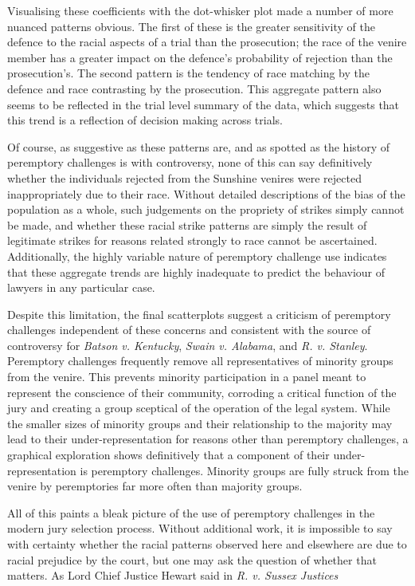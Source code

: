 \documentclass[12pt]{article}
\begin{document}
Visualising these coefficients with the dot-whisker plot made a number of more nuanced patterns obvious. The first of these is the greater sensitivity of the defence to the racial aspects of a trial than the prosecution; the race of the venire member has a greater impact on the defence's probability of rejection than the prosecution's. The second pattern is the tendency of race matching by the defence and race contrasting by the prosecution. This aggregate pattern also seems to be reflected in the trial level summary of the data, which suggests that this trend is a reflection of decision making across trials.

Of course, as suggestive as these patterns are, and as spotted as the history of peremptory challenges is with controversy, none of this can say definitively whether the individuals rejected from the Sunshine venires were rejected inappropriately due to their race. Without detailed descriptions of the bias of the population as a whole, such judgements on the propriety of strikes simply cannot be made, and whether these racial strike patterns are simply the result of legitimate strikes for reasons related strongly to race cannot be ascertained. Additionally, the highly variable nature of peremptory challenge use indicates that these aggregate trends are highly inadequate to predict the behaviour of lawyers in any particular case.

Despite this limitation, the final scatterplots suggest a criticism of peremptory challenges independent of these concerns and consistent with the source of controversy for \textit{Batson v. Kentucky}, \textit{Swain v. Alabama}, and \textit{R. v. Stanley}. Peremptory challenges frequently remove all representatives of minority groups from the venire. This prevents minority participation in a panel meant to represent the conscience of their community, corroding a critical function of the jury and creating a group sceptical of the operation of the legal system. While the smaller sizes of minority groups and their relationship to the majority may lead to their under-representation for reasons other than peremptory challenges, a graphical exploration shows definitively that a component of their under-representation is peremptory challenges. Minority groups are fully struck from the venire by peremptories far more often than majority groups.

All of this paints a bleak picture of the use of peremptory challenges in the modern jury selection process. Without additional work, it is impossible to say with certainty whether the racial patterns observed here and elsewhere are due to racial prejudice by the court, but one may ask the question of whether that matters. As Lord Chief Justice Hewart said in \textit{R. v. Sussex Justices}
\end{document}
